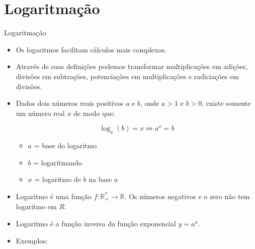 \documentclass[14pt, aspectratio=169]{beamer}
\newcommand{\R}{\mathbb{R}}
\newcommand{\skipframe}{\vspace{10.0cm}}
\begin{document}
\section{Logaritmação}

\begin{frame}[allowframebreaks]{Logaritmação}
    \begin{itemize}
        \item Os logaritmos facilitam cálculos mais complexos.
        \item Através de suas definições podemos transformar multiplicações em adições, divisões em subtrações, potenciações em multiplicações e radiciações em divisões.

        \skipframe

        \item Dados dois números reais positivos $a$ e $b$, onde $a > 1$ e $b > 0$, existe somente um número real $x$ de modo que:

        \begin{equation*}
            \log_a(b) = x \Leftrightarrow a^x = b
        \end{equation*}

        \begin{itemize}
            \item $a$ = base do logaritmo
            \item $b$ = logaritmando
            \item $x$ = logaritmo de $b$ na base $a$
        \end{itemize}

        \skipframe

        \item Logaritmo é uma função $f: \R_+^* \rightarrow \R$. Os números negativos e o zero não tem logaritmo em $R$.

        \item Logaritmo é a função inversa da função exponencial $y = a^x$.

        \skipframe

        \item Exemplos:

        \begin{enumerate}[a]
\end{enumerate}
\end{itemize}
\end{frame}
\end{document}
